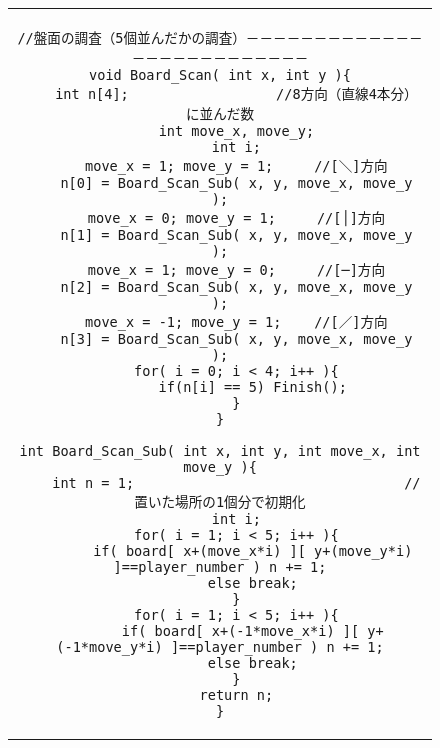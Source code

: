 \documentclass[uplatex,a4paper,11pt,oneside,openany]{jsbook}
\begin{document}
\begin{figure}[H]
  \centering
    \begin{tabular}{c}
\begin{minipage}{1.0\hsize}
  \centering
\begin{lstlisting}[caption=盤面チェック：連珠（五目並べ）,label=prog8]
//盤面の調査（5個並んだかの調査）－－－－－－－－－－－－－－－－－－－－－－－－－－
void Board_Scan( int x, int y ){
    int n[4];                  //8方向（直線4本分）に並んだ数
    int move_x, move_y;
    int i;
    move_x = 1; move_y = 1;     //[＼]方向
    n[0] = Board_Scan_Sub( x, y, move_x, move_y );
    move_x = 0; move_y = 1;     //[│]方向
    n[1] = Board_Scan_Sub( x, y, move_x, move_y );
    move_x = 1; move_y = 0;     //[─]方向
    n[2] = Board_Scan_Sub( x, y, move_x, move_y );
    move_x = -1; move_y = 1;    //[／]方向
    n[3] = Board_Scan_Sub( x, y, move_x, move_y );
    for( i = 0; i < 4; i++ ){
        if(n[i] == 5) Finish();
    }
}

int Board_Scan_Sub( int x, int y, int move_x, int move_y ){
    int n = 1;                                 //置いた場所の1個分で初期化
    int i;
    for( i = 1; i < 5; i++ ){
        if( board[ x+(move_x*i) ][ y+(move_y*i) ]==player_number ) n += 1;
        else break;
    }
    for( i = 1; i < 5; i++ ){
        if( board[ x+(-1*move_x*i) ][ y+(-1*move_y*i) ]==player_number ) n += 1;
        else break;
    }
    return n;
}
\end{lstlisting}
\end{minipage}
\end{tabular}
\end{figure}


%
\begin{thebibliography}{99}
\end{thebibliography}
%
\end{document}
